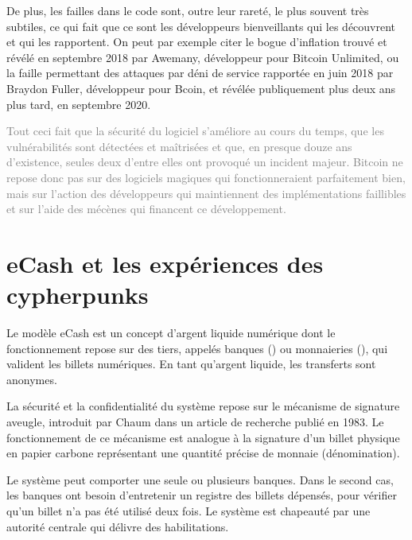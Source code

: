 De plus, les failles dans le code sont, outre leur rareté, le plus souvent très subtiles, ce qui fait que ce sont les développeurs bienveillants qui les découvrent et qui les rapportent. On peut par exemple citer le bogue d'inflation trouvé et révélé en septembre 2018 par Awemany, développeur pour Bitcoin Unlimited, ou la faille permettant des attaques par déni de service rapportée en juin 2018 par Braydon Fuller, développeur pour Bcoin, et révélée publiquement plus deux ans plus tard, en septembre 2020.

\textcolor{gray}{Tout ceci fait que la sécurité du logiciel s'améliore au cours du temps, que les vulnérabilités sont détectées et maîtrisées et que, en presque douze ans d'existence, seules deux d'entre elles ont provoqué un incident majeur. Bitcoin ne repose donc pas sur des logiciels magiques qui fonctionneraient parfaitement bien, mais sur l'action des développeurs qui maintiennent des implémentations faillibles et sur l'aide des mécènes qui financent ce développement.}

\section{eCash et les expériences des cypherpunks}


Le modèle eCash est un concept d'argent liquide numérique dont le fonctionnement repose sur des tiers, appelés banques () ou monnaieries (), qui valident les billets numériques. En tant qu'argent liquide, les transferts sont anonymes.


La sécurité et la confidentialité du système repose sur le mécanisme de signature aveugle, introduit par Chaum dans un article de recherche publié en 1983. Le fonctionnement de ce mécanisme est analogue à la signature d'un billet physique en papier carbone représentant une quantité précise de monnaie (dénomination).

Le système peut comporter une seule ou plusieurs banques. Dans le second cas, les banques ont besoin d'entretenir un registre des billets dépensés, pour vérifier qu'un billet n'a pas été utilisé deux fois. Le système est chapeauté par une autorité centrale qui délivre des habilitations.

